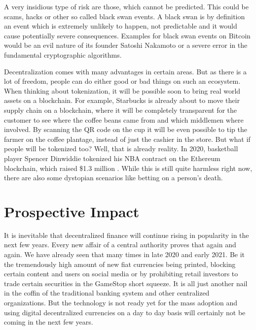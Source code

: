 A very insidious type of risk are those, which cannot be predicted. This could be scams, hacks or other so called black swan events. A black
swan is by definition an event which is extremely unlikely to happen, not predictable and it would cause potentially severe consequences.
Examples for black swan events on Bitcoin would be an evil nature of its founder Satoshi Nakamoto or a severe error in the fundamental
cryptographic algorithms.

Decentralization comes with many advantages in certain areas. But as there is a lot of freedom, people can do either good or bad things on such
an ecosystem. When thinking about tokenization, it will be possible soon to bring real world assets on a blockchain. For example, Starbucks is
already about to move their supply chain on a blockchain, where it will be completely transparent for the customer to see where the coffee beans
came from and which middlemen where involved. By scanning the QR code on the cup it will be even possible to tip the farmer on the coffee
plantage, instead of just the cashier in the store. But what if people will be tokenized too? Well, that is already reality. In 2020, basketball
player Spencer Dinwiddie tokenized his NBA contract on the Ethereum blockchain, which raised \$1.3 million \cite{Redman2020}. While this is still
quite harmless right now, there are also some dystopian scenarios like betting on a person's death.

\section{Prospective Impact}
It is inevitable that decentralized finance will continue rising in popularity in the next few years. Every new affair of a central authority
proves that again and again. We have already seen that many times in late 2020 and early 2021. Be it the tremendously high amount of new fiat
currencies being printed, blocking certain content and users on social media or by prohibiting retail investors to trade certain securities in
the GameStop short squeeze. It is all just another nail in the coffin of the traditional banking system and other centralized organizations.
But the technology is not ready yet for the mass adoption and using digital decentralized currencies on a day to day basis will certainly not
be coming in the next few years.
